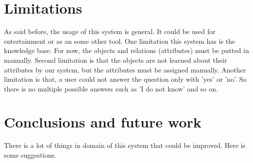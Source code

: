 \documentclass[a4paper]{article}
\begin{document}
\section{Limitations}
As said before, the usage of this system is general. It could be used for entertainment or as an some other tool. One limitation this system has is the knowledge base. For now, the objects and relations (attributes) must be putted in manually. Second limitation is that the  objects are not learned about their attributes by our system, but the attributes must be assigned manually. Another limitation is that, a user could not answer the question only with 'yes' or 'no'. So there is no multiple possible answers such as 'I do not know' and so on.
 
\section{Conclusions and future work}
There is a lot of things in domain of this system that could be improved. Here is some suggestions.
\end{document}

